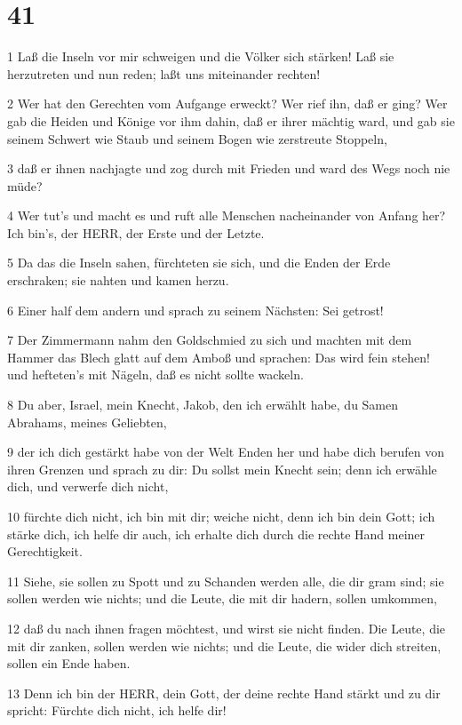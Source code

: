 \chapter{41}

\par 1 Laß die Inseln vor mir schweigen und die Völker sich stärken! Laß sie herzutreten und nun reden; laßt uns miteinander rechten!
\par 2 Wer hat den Gerechten vom Aufgange erweckt? Wer rief ihn, daß er ging? Wer gab die Heiden und Könige vor ihm dahin, daß er ihrer mächtig ward, und gab sie seinem Schwert wie Staub und seinem Bogen wie zerstreute Stoppeln,
\par 3 daß er ihnen nachjagte und zog durch mit Frieden und ward des Wegs noch nie müde?
\par 4 Wer tut's und macht es und ruft alle Menschen nacheinander von Anfang her? Ich bin's, der HERR, der Erste und der Letzte.
\par 5 Da das die Inseln sahen, fürchteten sie sich, und die Enden der Erde erschraken; sie nahten und kamen herzu.
\par 6 Einer half dem andern und sprach zu seinem Nächsten: Sei getrost!
\par 7 Der Zimmermann nahm den Goldschmied zu sich und machten mit dem Hammer das Blech glatt auf dem Amboß und sprachen: Das wird fein stehen! und hefteten's mit Nägeln, daß es nicht sollte wackeln.
\par 8 Du aber, Israel, mein Knecht, Jakob, den ich erwählt habe, du Samen Abrahams, meines Geliebten,
\par 9 der ich dich gestärkt habe von der Welt Enden her und habe dich berufen von ihren Grenzen und sprach zu dir: Du sollst mein Knecht sein; denn ich erwähle dich, und verwerfe dich nicht,
\par 10 fürchte dich nicht, ich bin mit dir; weiche nicht, denn ich bin dein Gott; ich stärke dich, ich helfe dir auch, ich erhalte dich durch die rechte Hand meiner Gerechtigkeit.
\par 11 Siehe, sie sollen zu Spott und zu Schanden werden alle, die dir gram sind; sie sollen werden wie nichts; und die Leute, die mit dir hadern, sollen umkommen,
\par 12 daß du nach ihnen fragen möchtest, und wirst sie nicht finden. Die Leute, die mit dir zanken, sollen werden wie nichts; und die Leute, die wider dich streiten, sollen ein Ende haben.
\par 13 Denn ich bin der HERR, dein Gott, der deine rechte Hand stärkt und zu dir spricht: Fürchte dich nicht, ich helfe dir!
